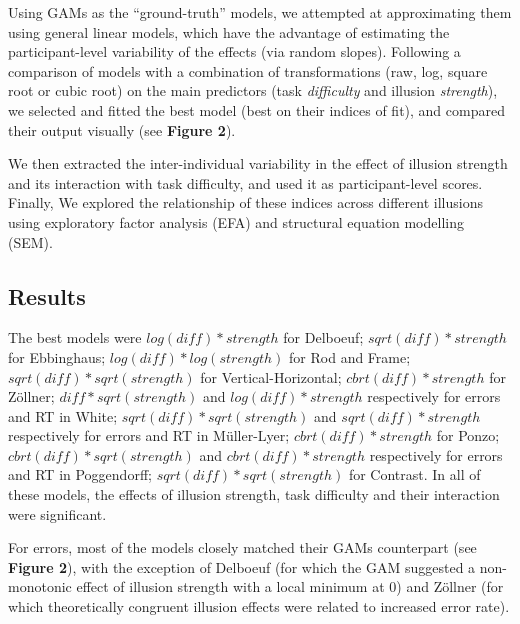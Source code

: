 \documentclass[
  man,floatsintext]{apa6}
\begin{document}
Using GAMs as the ``ground-truth'' models, we attempted at approximating them using general linear models, which have the advantage of estimating the participant-level variability of the effects (via random slopes). Following a comparison of models with a combination of transformations (raw, log, square root or cubic root) on the main predictors (task \emph{difficulty} and illusion \emph{strength}), we selected and fitted the best model (best on their indices of fit), and compared their output visually (see \textbf{Figure 2}).

We then extracted the inter-individual variability in the effect of illusion strength and its interaction with task difficulty, and used it as participant-level scores. Finally, We explored the relationship of these indices across different illusions using exploratory factor analysis (EFA) and structural equation modelling (SEM).

\hypertarget{results-1}{%
\subsection{Results}\label{results-1}}

The best models were \(log(diff)*strength\) for Delboeuf; \(sqrt(diff)*strength\) for Ebbinghaus; \(log(diff)*log(strength)\) for Rod and Frame; \(sqrt(diff)*sqrt(strength)\) for Vertical-Horizontal; \(cbrt(diff)*strength\) for Zöllner; \(diff*sqrt(strength)\) and \(log(diff)*strength\) respectively for errors and RT in White; \(sqrt(diff)*sqrt(strength)\) and \(sqrt(diff)*strength\) respectively for errors and RT in Müller-Lyer; \(cbrt(diff)*strength\) for Ponzo; \(cbrt(diff)*sqrt(strength)\) and \(cbrt(diff)*strength\) respectively for errors and RT in Poggendorff; \(sqrt(diff)*sqrt(strength)\) for Contrast. In all of these models, the effects of illusion strength, task difficulty and their interaction were significant.

For errors, most of the models closely matched their GAMs counterpart (see \textbf{Figure 2}), with the exception of Delboeuf (for which the GAM suggested a non-monotonic effect of illusion strength with a local minimum at 0) and Zöllner (for which theoretically congruent illusion effects were related to increased error rate).
\end{document}
